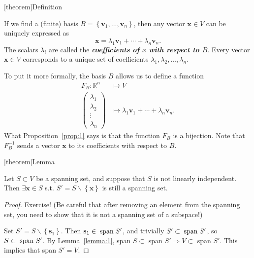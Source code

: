 \documentclass[12pt]{report}
\theoremstyle{definition}
\begin{document}
[theorem]{Definition}
\begin{coefficients of x with respect to B}
    If we find a (finite) basis $B = \left\{\mathbf{v}_1,\ldots,\mathbf{v}_n\right\} $,
    then any vector $\mathbf{x} \in V$ can be uniquely expressed as\[
        \mathbf{x} = \lambda_1 \mathbf{v}_1 + \cdots + \lambda_n \mathbf{v}_n.
    \]The scalars $\lambda_i$ are called the \textbf{\emph{coefficients of $x$ with respect to $B$}}.
    Every vector $\mathbf{x}\in V$ corresponds to a unique set of coefficients
    $\lambda_1, \lambda_2, \ldots, \lambda_n$.
\end{coefficients of x with respect to B}
To put it more formally, the basis $B$ allows us to define a function\[
    \begin{align*}
        F_B:\mathbb{R}^{n} & \mapsto V \\
        \begin{pmatrix}
                \lambda_1 \\
                \lambda_2 \\
                \vdots \\
                \lambda_n
            \end{pmatrix} & \mapsto \lambda_1 \mathbf{v}_1 + \cdots + \lambda_n \mathbf{v}_n.
    \end{align*}
\]
What Proposition~\ref{prop:1} says is that the function $F_B$ is a bijection.
Note that $F_B^{-1}$ sends a vector $\mathbf{x}$ to its coefficients with respect to $B$.

[theorem]{Lemma}
\begin{linearly dependent spanning set removed an element to be linearly independent}
    Let $S \subset V$ be a spanning set, and suppose that $S$ is not linearly independent.
    Then $\exists \mathbf{x}\in S$ s.t. $S' = S\backslash\left\{\mathbf{x}\right\} $ is still a spanning set.
\end{linearly dependent spanning set removed an element to be linearly independent}

\begin{proof}
    Exercise!
    (Be careful that after removing an element from the spanning set,
    you need to show that it is not a spanning set of a subspace!)
    
    Set $S' = S \backslash\left\{\mathbf{s}_1\right\} $. Then $\mathbf{s}_1 \in \;\textnormal{span}\;{S'}$,
    and trivially $S' \subset \;\textnormal{span}\;{S'}$, so $S \subset \;\textnormal{span}\;{S'}$.
    By Lemma~\ref{lemma:1}, span $S \subset$ span $S' \Rightarrow{} V \subset$ span $S'$.
    This implies that span $S' = V$.
\end{proof}
\end{document}
